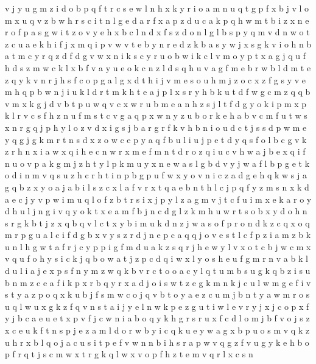 \documentclass{article}
\begin{document}
v j y u g m z i d o b p q f t r c s e w l n h x k
y r i o a m n u q t g p f x b j v l
o m x u q v z b w h r s c i t n l g e d a
r f x a p z
d u c a k p q h w m t b i z x n e r o
f p a s g w i t z o v y e h x b c l n d
x f s z d o n l
g l b s p y q m v d n w o t z c u a e k h i f j x
m
q i p v w
v t e b y n r
e d z k b a s y
w j x s g k v i o h n b a t m c y r q z d
f d g v w x n i k s c y r u o b
w i k c l v m o y p t x a g j q u f h d s z
m w c k l x b f v a y u e o
k c n z l d s q h u v a g f m e b r
w b l d m t e z q y k v n r j h s f c o p g a
l g x d t h i j v m e s o u
h m j z
o c x z f g s y v e m h q p b w n j i u k l d r t
m k h t e
a j p l x s r y h b k u t d f w g c m z q
q b v
m x k g j d v b t p u w
q v c x w r u b m e a n h z s j l t f d g y o k i p
m x p k l r v c s f h z n u
f m s t c v g a q p x w n y z u b o r k e h
a b v c m f u t w s x n r g q j p h y l o z
v d x i g s j b a r
g r
f k v h b n i o u d c t j s
s d p w m e y q g
j g k m r t n s d x z o w c e p y a q f b u l i
u j p e t d y q s f o l b c g v k z r h n x i a w
x q
i h e c n w r x m
e f m n t d r o z q i u c v h w a j b
e x q i f n u o v p a k g m j z h t y l
p k m u y x n e w a s l g b d v
y j w a f l b p g e t k o d i n m v q s u z h c r
h t i n p
b g
p
u f w x y o v n i c z a d g e h q
k w s j a g q b z x y
o a
j a b i l s z c x
l a f v r x t q
a e b n t h l c j p q f y z m s
n x k d a e c j y v p w i m u q l o f z b t r
s i x j p y l z a g m
v j t c f u i m x e k a r o y
d h u l j n g i v q y o k t x e a m f b
j n c d g l z k m h u w r t s o b x y
d o h n s r g k b t j z x q
b
q v l c t x y b i m u k d n z j w a s o f p
r o n d k z c q
x o q m r p g u a l c i f d
g b x v y s z r d j n e p c a q
q j o v e s t l c f p z i a
m z b k u n l h g w t a f r j c y p
p i g f m d u a k z s q r j h e w y l v x o t c b
j w c m x v q u f o h y s i
c k j q b o w a
t j z p c d q i w x l y o s h e u f g m r n v a b k
l
d u l i a j e x p s f n y m z w q k b v r c t o
o a c y l q t u m b s
u g k q b z i
s u b n m z c e a f i k p x r
b q y r x a d j o i s w t z e g k m
n k j c u l w m g e f i v s t y a z p o q x
k u b j f s
m w c o j q v
b t o y a e z c u m
j b n t y a w m r o s u q
l w u x g k z f q v n s t a i j y e
l n w k p e
z g u t i w l e v r y j x
j c o p x f
y j b c a e u
e t x p v f j c w n i a b o q y k h g r
s r u x f c d l o
m j b
f v o j s z x c e u k
f t n s p j e z a m l d o r w b y i c q k u
e y w a g x b p u o s m v
q k z u
h r x b l q o j a c u s i t p e f v w n
n b i h s r a p w v q g z f
v u g y k e h b o p f r q t j s c m w x
t r g k q l w x v o p f h z
t e m v q r l x c s n
\end{document}

